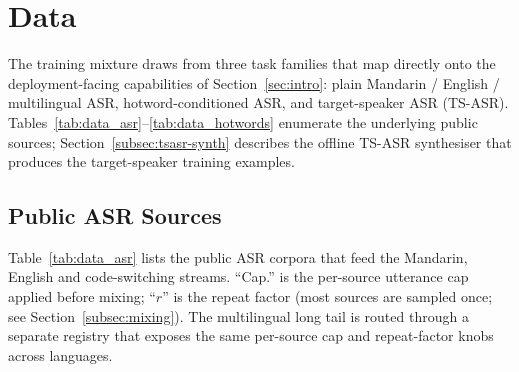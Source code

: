 \section{Data}
\label{sec:data}

The training mixture draws from three task families that map
directly onto the deployment-facing capabilities of
Section~\ref{sec:intro}: plain Mandarin / English / multilingual
ASR, hotword-conditioned ASR, and target-speaker ASR (TS-ASR).
Tables~\ref{tab:data_asr}--\ref{tab:data_hotwords} enumerate the
underlying public sources; Section~\ref{subsec:tsasr-synth}
describes the offline TS-ASR synthesiser that produces the
target-speaker training examples.

\subsection{Public ASR Sources}
\label{subsec:asr-sources}

Table~\ref{tab:data_asr} lists the public ASR corpora that feed the
Mandarin, English and code-switching streams. ``Cap.'' is the
per-source utterance cap applied before mixing; ``$r$'' is the repeat
factor (most sources are sampled once; see
Section~\ref{subsec:mixing}). The multilingual long tail is routed
through a separate registry that exposes the same per-source cap and
repeat-factor knobs across languages.

